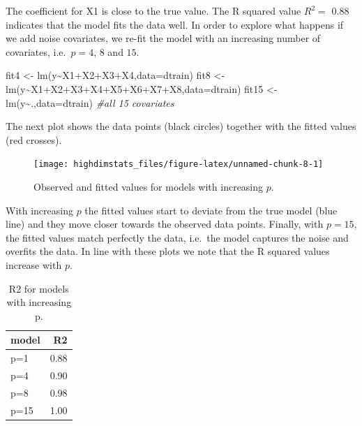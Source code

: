 \documentclass[
]{book}
\newenvironment{Shaded}{\begin{snugshade}}{\end{snugshade}}
\newcommand{\AttributeTok}[1]{\textcolor[rgb]{0.77,0.63,0.00}{#1}}
\newcommand{\CommentTok}[1]{\textcolor[rgb]{0.56,0.35,0.01}{\textit{#1}}}
\newcommand{\FunctionTok}[1]{\textcolor[rgb]{0.00,0.00,0.00}{#1}}
\newcommand{\NormalTok}[1]{#1}
\newcommand{\OtherTok}[1]{\textcolor[rgb]{0.56,0.35,0.01}{#1}}
\newcommand{\SpecialCharTok}[1]{\textcolor[rgb]{0.00,0.00,0.00}{#1}}
\begin{document}
The coefficient for X1 is close to the true value. The R squared value \(R^2=\) 0.88 indicates that the model fits the data well. In order to explore what happens if we add noise covariates, we re-fit the model with an increasing number of covariates, i.e.~\(p=4\), \(8\) and \(15\).

\begin{Shaded}
\begin{Highlighting}[]
\NormalTok{fit4 }\OtherTok{\textless{}{-}} \FunctionTok{lm}\NormalTok{(y}\SpecialCharTok{\textasciitilde{}}\NormalTok{X1}\SpecialCharTok{+}\NormalTok{X2}\SpecialCharTok{+}\NormalTok{X3}\SpecialCharTok{+}\NormalTok{X4,}\AttributeTok{data=}\NormalTok{dtrain)}
\NormalTok{fit8 }\OtherTok{\textless{}{-}} \FunctionTok{lm}\NormalTok{(y}\SpecialCharTok{\textasciitilde{}}\NormalTok{X1}\SpecialCharTok{+}\NormalTok{X2}\SpecialCharTok{+}\NormalTok{X3}\SpecialCharTok{+}\NormalTok{X4}\SpecialCharTok{+}\NormalTok{X5}\SpecialCharTok{+}\NormalTok{X6}\SpecialCharTok{+}\NormalTok{X7}\SpecialCharTok{+}\NormalTok{X8,}\AttributeTok{data=}\NormalTok{dtrain)}
\NormalTok{fit15 }\OtherTok{\textless{}{-}} \FunctionTok{lm}\NormalTok{(y}\SpecialCharTok{\textasciitilde{}}\NormalTok{.,}\AttributeTok{data=}\NormalTok{dtrain) }\CommentTok{\#all 15 covariates}
\end{Highlighting}
\end{Shaded}

The next plot shows the data points (black circles) together with the fitted values (red crosses).

\begin{figure}

{\centering \texttt{[image: highdimstats\_files/figure-latex/unnamed-chunk-8-1]} 

}

\caption{Observed and fitted values for models with increasing $p$.}\label{fig:unnamed-chunk-8}
\end{figure}

With increasing \(p\) the fitted values start to deviate from the true model (blue line) and they move closer towards the observed data points. Finally, with \(p=15\), the fitted values match perfectly the data, i.e.~the model captures the noise and overfits the data. In line with these plots we note that the R squared values increase with \(p\).

\begin{table}

\caption{\label{tab:unnamed-chunk-9}R2 for models with increasing p.}
\centering
\begin{tabular}[t]{lr}
\toprule
model & R2\\
\midrule
p=1 & 0.88\\
p=4 & 0.90\\
p=8 & 0.98\\
p=15 & 1.00\\
\bottomrule
\end{tabular}
\end{table}
\end{document}
